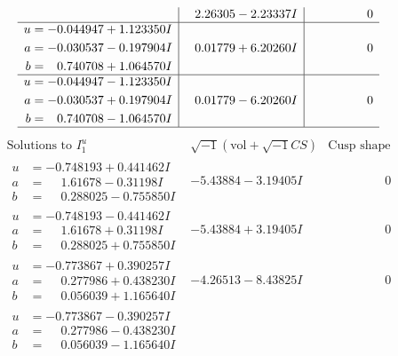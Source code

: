 \documentclass[1p]{elsarticle_modified}
\theoremstyle{definition}
\newcommand{\I}{\sqrt{-1}}
\begin{document}
$$\begin{array}{c|c|c}
 & \phantom{-}2.26305 - 2.23337 I & \phantom{-0.000000 } 0 \\ \hline\begin{aligned}
u &= -0.044947 + 1.123350 I \\
a &= -0.030537 - 0.197904 I \\
b &= \phantom{-}0.740708 + 1.064570 I\end{aligned}
 & \phantom{-}0.01779 + 6.20260 I & \phantom{-0.000000 } 0 \\ \hline\begin{aligned}
u &= -0.044947 - 1.123350 I \\
a &= -0.030537 + 0.197904 I \\
b &= \phantom{-}0.740708 - 1.064570 I\end{aligned}
 & \phantom{-}0.01779 - 6.20260 I & \phantom{-0.000000 } 0\\
 \hline 
 \end{array}$$\newpage$$\begin{array}{c|c|c}  
\text{Solutions to }I^u_{1}& \I (\text{vol} + \sqrt{-1}CS) & \text{Cusp shape}\\
 \hline 
\begin{aligned}
u &= -0.748193 + 0.441462 I \\
a &= \phantom{-}1.61678 - 0.31198 I \\
b &= \phantom{-}0.288025 - 0.755850 I\end{aligned}
 & -5.43884 - 3.19405 I & \phantom{-0.000000 } 0 \\ \hline\begin{aligned}
u &= -0.748193 - 0.441462 I \\
a &= \phantom{-}1.61678 + 0.31198 I \\
b &= \phantom{-}0.288025 + 0.755850 I\end{aligned}
 & -5.43884 + 3.19405 I & \phantom{-0.000000 } 0 \\ \hline\begin{aligned}
u &= -0.773867 + 0.390257 I \\
a &= \phantom{-}0.277986 + 0.438230 I \\
b &= \phantom{-}0.056039 + 1.165640 I\end{aligned}
 & -4.26513 - 8.43825 I & \phantom{-0.000000 } 0 \\ \hline\begin{aligned}
u &= -0.773867 - 0.390257 I \\
a &= \phantom{-}0.277986 - 0.438230 I \\
b &= \phantom{-}0.056039 - 1.165640 I\end{aligned}

\end{array}$$
\end{document}
